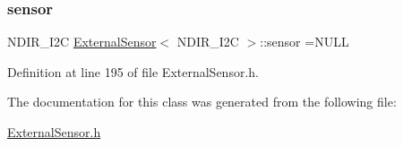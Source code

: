 \subsubsection{\texorpdfstring{sensor}{sensor}}
{\footnotesize\ttfamily N\+D\+I\+R\+\_\+\+I2C \hyperlink{classExternalSensor}{External\+Sensor}$<$ N\+D\+I\+R\+\_\+\+I2C $>$\+::sensor =N\+U\+LL\hspace{0.3cm}{\ttfamily [private]}}



Definition at line 195 of file External\+Sensor.\+h.



The documentation for this class was generated from the following file\+:\begin{DoxyCompactItemize}
\item 
\hyperlink{ExternalSensor_8h}{External\+Sensor.\+h}\end{DoxyCompactItemize}
